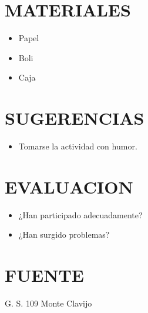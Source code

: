 \documentclass[72pt]{article}
\begin{document}
\section*{MATERIALES} 
\begin{itemize}
    \item Papel
    \item Boli
    \item Caja
\end{itemize}

\section*{SUGERENCIAS}
\begin{itemize}
    \item Tomarse la actividad con humor.
\end{itemize}

\section*{EVALUACION} 
\begin{itemize}
    \item ¿Han participado adecuadamente?
    \item ¿Han surgido problemas?
\end{itemize}

\section*{FUENTE}
G. S. 109 Monte Clavijo
\end{document}

